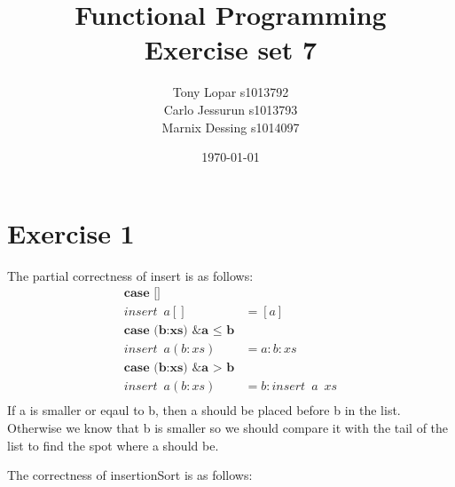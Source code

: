 \documentclass{article}
\begin{document}
\title{Functional Programming \\ Exercise set 7}
\date{\today}
\author{Tony Lopar s1013792 \\ Carlo Jessurun s1013793 \\ Marnix Dessing s1014097}
\maketitle

\section*{Exercise 1}
The partial correctness of insert is as follows:
\begin{align*}
  \textbf{case []} &\enspace \\
  insert \enspace a [] &= [a] \\
  \textbf{case (b:xs) \& a $\leq$ b} &\enspace \\
  insert \enspace a (b:xs) &= a:b:xs \\
  \textbf{case (b:xs) \& a $>$ b} &\enspace \\
  insert \enspace a (b:xs) &= b:insert \enspace a \enspace xs \\
\end{align*}
If a is smaller or eqaul to b, then a should be placed before b in the list. Otherwise we know that b is smaller so we should compare it with the tail of the list to find the spot where a should be.

The correctness of insertionSort is as follows:
\end{document}

